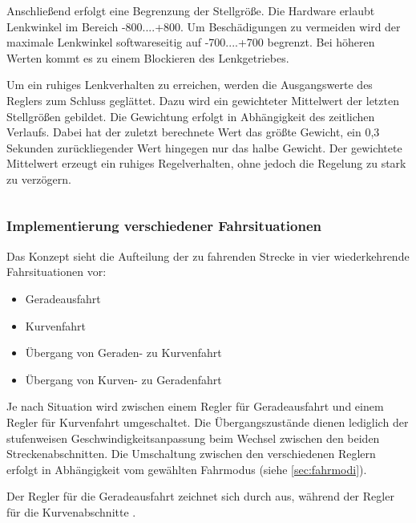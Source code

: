 
Anschließend erfolgt eine Begrenzung der Stellgröße. Die Hardware erlaubt Lenkwinkel im Bereich -800....+800. Um Beschädigungen zu vermeiden wird der maximale Lenkwinkel softwareseitig auf -700....+700 begrenzt. Bei höheren Werten kommt es zu einem Blockieren des Lenkgetriebes.

Um ein ruhiges Lenkverhalten zu erreichen, werden die Ausgangswerte des Reglers zum Schluss geglättet. Dazu wird ein gewichteter Mittelwert der letzten Stellgrößen gebildet. Die Gewichtung erfolgt in Abhängigkeit des zeitlichen Verlaufs. Dabei hat der zuletzt berechnete Wert das größte Gewicht, ein 0,3 Sekunden zurückliegender Wert hingegen nur das halbe Gewicht. Der gewichtete Mittelwert erzeugt ein ruhiges Regelverhalten, ohne jedoch die Regelung zu stark zu verzögern.

\begin{lstlisting}

\end{lstlisting}

\subsubsection{Implementierung verschiedener Fahrsituationen}
\label{sec:fahrsituationen}
Das Konzept sieht die Aufteilung der zu fahrenden Strecke in vier wiederkehrende Fahrsituationen vor:

\begin{itemize}
	\item Geradeausfahrt
	\item Kurvenfahrt
	\item Übergang von Geraden- zu Kurvenfahrt
	\item Übergang von Kurven- zu Geradenfahrt
\end{itemize}

Je nach Situation wird zwischen einem Regler für Geradeausfahrt und einem Regler für Kurvenfahrt umgeschaltet. Die Übergangszustände dienen lediglich der stufenweisen Geschwindigkeitsanpassung beim Wechsel zwischen den beiden Streckenabschnitten. Die Umschaltung zwischen den verschiedenen Reglern erfolgt in Abhängigkeit vom gewählten Fahrmodus (siehe \autoref{sec:fahrmodi}).

Der Regler für die Geradeausfahrt zeichnet sich durch  aus, während der Regler für die Kurvenabschnitte .


